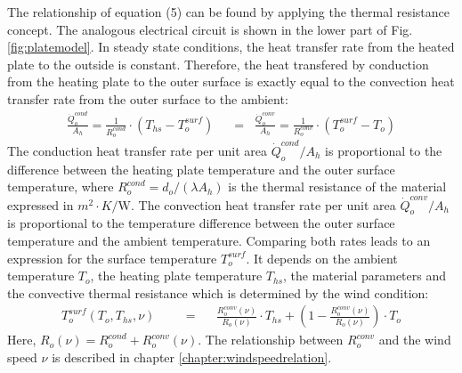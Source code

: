 The relationship of equation (5) can be found by applying the thermal resistance concept. The analogous electrical circuit is shown in the lower part of Fig. \ref{fig:platemodel}. In steady state conditions, the heat transfer rate from the heated plate to the outside is constant. Therefore, the heat transfered by conduction from the heating plate to the outer surface is exactly equal to the convection heat transfer rate from the outer surface to the ambient:
\begin{align}
\frac{\dot Q_o^{cond}}{A_h} = \frac{1}{R_o^{cond}}\cdot (T_{hs}-T_o^{surf}) \;\; &= \;\;\frac{\dot Q_o^{conv}}{A_h} = \frac{1}{R_o^{conv}}\cdot (T_o^{surf}-T_{o})
\end{align}
The conduction heat transfer rate per unit area \(\dot Q_o^{cond}/A_h\) is proportional to the difference between the heating plate temperature and the outer surface temperature, where \(R_o^{cond} = d_o/(\lambda A_h)\) is the thermal resistance of the material expressed in \(m^2\cdot K/\mathrm{W}\). The convection heat transfer rate per unit area \(\dot Q_o^{conv}/A_h\) is proportional to the temperature difference between the outer surface temperature and the ambient temperature. Comparing both rates leads to an expression for the surface temperature $T_o^{surf}$. It depends on the ambient temperature $T_o$, the heating plate temperature $T_{hs}$, the material parameters and the convective thermal resistance  which is determined by the wind condition:
\begin{align}
T_o^{surf}(T_o,T_{hs},\nu) \;\;\;\;\; &= \;\;\;\;\; \frac{R_o^{conv}(\nu)}{R_{o}(\nu)}\cdot T_{hs} + (1-\frac{R_o^{conv}(\nu)}{R_{o}(\nu)})\cdot T_o
\end{align}
Here, $R_o(\nu) = R_o^{cond} + R_o^{conv}(\nu)$. The relationship between \(R_o^{conv}\) and the wind speed \(\nu\) is described in chapter \ref{chapter:windspeedrelation}. 

